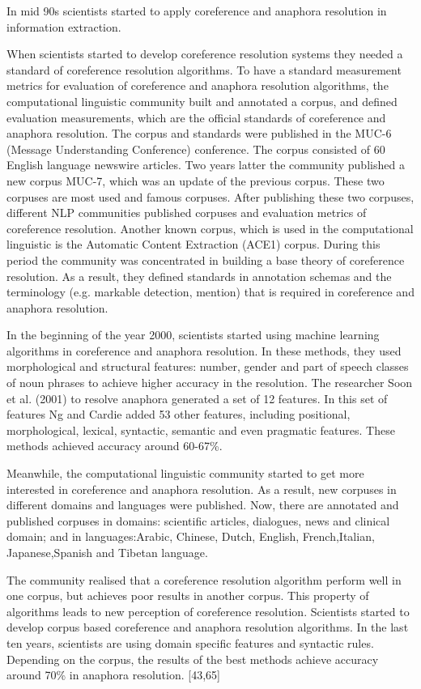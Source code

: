 In mid 90s scientists started to apply coreference and anaphora resolution in information extraction. 

When scientists started to develop coreference resolution systems they needed a standard of coreference resolution algorithms. To have a standard measurement metrics for evaluation of coreference and anaphora resolution algorithms, the computational linguistic community built and annotated a corpus, and defined evaluation measurements, which are the official standards of coreference and anaphora resolution. The corpus and standards were published in the MUC-6 (Message Understanding Conference) conference. The corpus consisted of 60 English language newswire articles. Two years latter the community published a new corpus MUC-7, which was an update of the previous corpus. These two corpuses are most used and famous corpuses. After publishing these two corpuses, different NLP communities published corpuses and evaluation metrics of coreference resolution. Another known corpus, which is used in the computational linguistic is the Automatic Content Extraction (ACE1) corpus. During this period the community was concentrated in building a base theory of coreference resolution. As a result, they defined standards in annotation schemas and the terminology (e.g. markable detection, mention) that is required in coreference and anaphora resolution. 

In the beginning of the year 2000, scientists started using machine learning algorithms in coreference and anaphora resolution. In these methods, they used morphological and structural features: number, gender and part of speech  classes of noun phrases to achieve higher accuracy in the resolution. The researcher Soon et al. (2001) to resolve anaphora generated a set of 12 features. In this set of features Ng and Cardie added 53 other features, including positional, morphological, lexical, syntactic, semantic and even pragmatic features. These methods achieved accuracy around 60-67\%. 

 Meanwhile, the computational linguistic community started to get more interested in coreference and anaphora resolution. As a result, new corpuses in different domains and languages were published. Now, there are annotated and published corpuses in domains: scientific articles, dialogues, news and clinical domain; and in languages:Arabic, Chinese, Dutch, English, French,Italian, Japanese,Spanish and Tibetan language. 

The community realised that a coreference resolution algorithm perform well in one corpus, but achieves poor results in another corpus. This property of algorithms leads to new perception of coreference resolution. Scientists started to develop corpus based coreference and anaphora resolution algorithms. In the last ten years, scientists are using domain specific features and syntactic rules. Depending on the corpus, the results of the best methods achieve accuracy around 70\% in anaphora resolution. [43,65]

